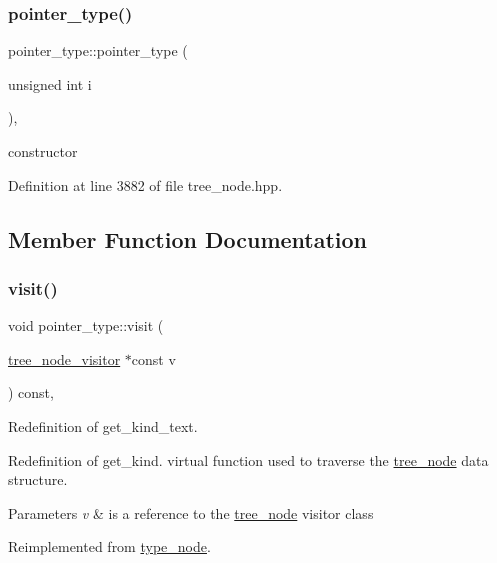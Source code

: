 \subsubsection{\texorpdfstring{pointer\+\_\+type()}{pointer\_type()}}
{\footnotesize\ttfamily pointer\+\_\+type\+::pointer\+\_\+type (\begin{DoxyParamCaption}\item[{unsigned int}]{i }\end{DoxyParamCaption})\hspace{0.3cm}{\ttfamily [inline]}, {\ttfamily [explicit]}}



constructor 



Definition at line 3882 of file tree\+\_\+node.\+hpp.



\subsection{Member Function Documentation}
\mbox{\label{structpointer__type_aa2f2890548ddc7599a180a59c1635c93}} 
\subsubsection{\texorpdfstring{visit()}{visit()}}
{\footnotesize\ttfamily void pointer\+\_\+type\+::visit (\begin{DoxyParamCaption}\item[{\hyperlink{classtree__node__visitor}{tree\+\_\+node\+\_\+visitor} $\ast$const}]{v }\end{DoxyParamCaption}) const\hspace{0.3cm}{\ttfamily [override]}, {\ttfamily [virtual]}}



Redefinition of get\+\_\+kind\+\_\+text. 

Redefinition of get\+\_\+kind. virtual function used to traverse the \hyperlink{classtree__node}{tree\+\_\+node} data structure. 
\begin{DoxyParams}{Parameters}
{\em v} & is a reference to the \hyperlink{classtree__node}{tree\+\_\+node} visitor class \\
\hline
\end{DoxyParams}


Reimplemented from \hyperlink{structtype__node_adc6e447af5f9505e6305320933c46a96}{type\+\_\+node}.



